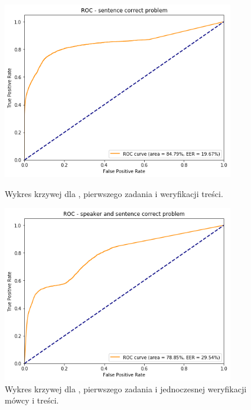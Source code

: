 \begin{figure}[H]
    \centering
    \begin{minipage}{.5\textwidth}
        \centering
        \includegraphics[width=0.9\textwidth]{images/4_3_dnn_roc_sentence}
        \caption{Wykres krzywej  dla , pierwszego zadania  i weryfikacji treści.}
        \label{fig:4_3_dnn_roc_sentence}
    \end{minipage}%
    \begin{minipage}{.5\textwidth}
        \centering
        \includegraphics[width=0.9\textwidth]{images/4_3_dnn_roc_both}
        \caption{Wykres krzywej  dla , pierwszego zadania  i jednoczesnej weryfikacji mówcy i treści.}
        \label{fig:4_3_dnn_roc_both}
    \end{minipage}
\end{figure}


